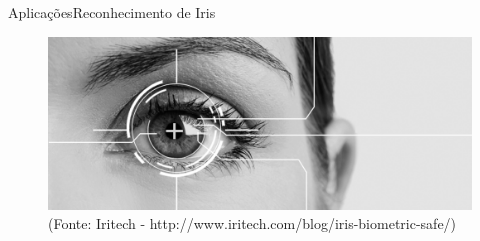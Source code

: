 \begin{frame}{Aplicações}{Reconhecimento de Iris}

\begin{figure}

    \centering
    \includegraphics[scale=.3]{img/iris_recognition.png}
    \\ (Fonte: Iritech - http://www.iritech.com/blog/iris-biometric-safe/)
    \label{fig:iris_recognition}
\end{figure}

\end{frame}
